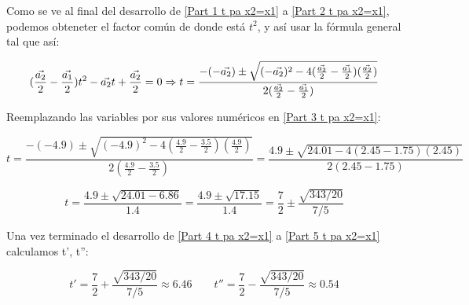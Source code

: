 \documentclass[12pt,letterpaper]{article}
\begin{document}
\begin{enumerate}
\begin{enumerate}
            Como se ve al final del desarrollo de  \ref{Part 1 t pa x2=x1} a \ref{Part 2 t pa x2=x1}, podemos obteneter el factor común de donde está $t^{2}$, y así usar la fórmula general tal que así:
                
                \begin{equation}
                    \label{Part 3 t pa x2=x1}
                    (\frac{\vec{a_{2}}}{2}-\frac{\vec{a_{1}}}{2})t^{2}-\vec{a_{2}}t+\frac{\vec{a_{2}}}{2}=0\\ \\
                    \Rightarrow \\ \\
                    t=\frac{-(-\vec{a_{2}})\pm \sqrt{(-\vec{a_{2}})^{2}-4(\frac{\vec{a_{2}}}{2}-\frac{\vec{a_{1}}}{2})(\frac{\vec{a_{2}}}{2})}}{2(\frac{\vec{a_{2}}}{2}-\frac{\vec{a_{1}}}{2})}
                \end{equation}

            Reemplazando las variables por sus valores numéricos en \ref{Part 3 t pa x2=x1}:

                \begin{equation}
                    \label{Part 4 t pa x2=x1}
                    t=
                    \frac{-(-4.9)\pm \sqrt{(-4.9)^{2}-4(\frac{4.9}{2}-\frac{3.5}{2})(\frac{4.9}{2})}}{2(\frac{4.9}{2}-\frac{3.5}{2})}
                    =
                    \frac{4.9\pm \sqrt{24.01-4(2.45-1.75)(2.45)}}{2(2.45-1.75)}
                \end{equation}

                \begin{equation}
                    \label{Part 5 t pa x2=x1}
                    t=
                    \frac{4.9\pm \sqrt{24.01-6.86}}{1.4}
                    =
                    \frac{4.9\pm \sqrt{17.15}}{1.4}
                    =
                    \frac{7}{2}\pm \frac{\sqrt{343/20}}{7/5}
                \end{equation}

            Una vez terminado el desarrollo de  \ref{Part 4 t pa x2=x1} a \ref{Part 5 t pa x2=x1} calculamos t', t'':

                \begin{equation}
                    \label{Part 6 t pa x2=x1}
                    t'=
                    \frac{7}{2}+\frac{\sqrt{343/20}}{7/5} 
                    \approx 6.46 \quad \quad
                    t''=
                    \frac{7}{2}-\frac{\sqrt{343/20}}{7/5}
                    \approx 0.54
                \end{equation}


\end{enumerate}
\end{enumerate}
\end{document}
